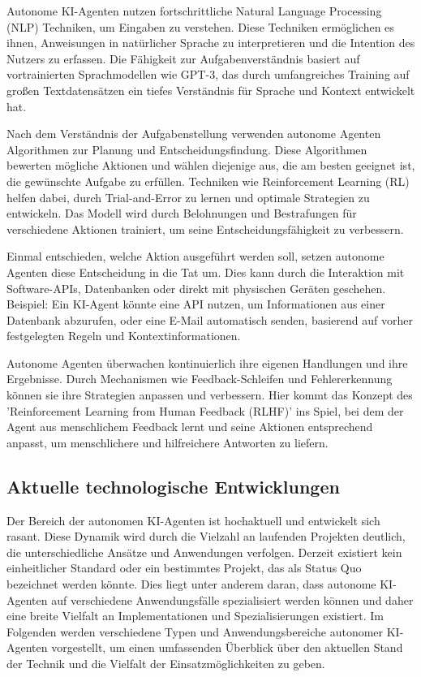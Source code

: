 \documentclass[conference]{IEEEtran}
\begin{document}
Autonome KI-Agenten nutzen fortschrittliche Natural Language Processing (NLP) Techniken, um Eingaben zu verstehen. Diese Techniken ermöglichen es ihnen, Anweisungen in natürlicher Sprache zu interpretieren und die Intention des Nutzers zu erfassen. Die Fähigkeit zur Aufgabenverständnis basiert auf vortrainierten Sprachmodellen wie GPT-3, das durch umfangreiches Training auf großen Textdatensätzen ein tiefes Verständnis für Sprache und Kontext entwickelt hat\cite{barua_exploring_2024}.

Nach dem Verständnis der Aufgabenstellung verwenden autonome Agenten Algorithmen zur Planung und Entscheidungsfindung. Diese Algorithmen bewerten mögliche Aktionen und wählen diejenige aus, die am besten geeignet ist, die gewünschte Aufgabe zu erfüllen. Techniken wie Reinforcement Learning (RL) helfen dabei, durch Trial-and-Error zu lernen und optimale Strategien zu entwickeln. Das Modell wird durch Belohnungen und Bestrafungen für verschiedene Aktionen trainiert, um seine Entscheidungsfähigkeit zu verbessern\cite{chu_240203628_nodate}.

Einmal entschieden, welche Aktion ausgeführt werden soll, setzen autonome Agenten diese Entscheidung in die Tat um. Dies kann durch die Interaktion mit Software-APIs, Datenbanken oder direkt mit physischen Geräten geschehen. Beispiel: Ein KI-Agent könnte eine API nutzen, um Informationen aus einer Datenbank abzurufen, oder eine E-Mail automatisch senden, basierend auf vorher festgelegten Regeln und Kontextinformationen\cite{hague_multimodality_2024}.

Autonome Agenten überwachen kontinuierlich ihre eigenen Handlungen und ihre Ergebnisse. Durch Mechanismen wie Feedback-Schleifen und Fehlererkennung können sie ihre Strategien anpassen und verbessern. Hier kommt das Konzept des 'Reinforcement Learning from Human Feedback (RLHF)' ins Spiel, bei dem der Agent aus menschlichem Feedback lernt und seine Aktionen entsprechend anpasst, um menschlichere und hilfreichere Antworten zu liefern\cite{barua_exploring_2024}.

\subsection{Aktuelle technologische Entwicklungen}

Der Bereich der autonomen KI-Agenten ist hochaktuell und entwickelt sich rasant. Diese Dynamik wird durch die Vielzahl an laufenden Projekten deutlich, die unterschiedliche Ansätze und Anwendungen verfolgen. Derzeit existiert kein einheitlicher Standard oder ein bestimmtes Projekt, das als Status Quo bezeichnet werden könnte. Dies liegt unter anderem daran, dass autonome KI-Agenten auf verschiedene Anwendungsfälle spezialisiert werden können und daher eine breite Vielfalt an Implementationen und Spezialisierungen existiert. Im Folgenden werden verschiedene Typen und Anwendungsbereiche autonomer KI-Agenten vorgestellt, um einen umfassenden Überblick über den aktuellen Stand der Technik und die Vielfalt der Einsatzmöglichkeiten zu geben.
\end{document}
